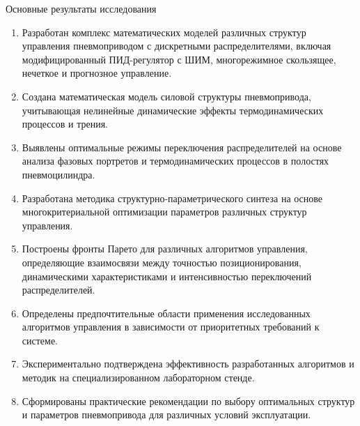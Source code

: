 \begin{frame}{Основные результаты исследования}
	\begin{enumerate}
		\item \scriptsize Разработан комплекс математических моделей различных структур управления пневмоприводом с дискретными распределителями, включая модифицированный
		      ПИД-регулятор с ШИМ, многорежимное скользящее, нечеткое и прогнозное управление.
		\item \scriptsize Создана математическая модель силовой структуры
		      пневмопривода, учитывающая нелинейные динамические эффекты термодинамических процессов и трения.
		\item \scriptsize Выявлены оптимальные режимы переключения распределителей на
		      основе анализа фазовых портретов и термодинамических процессов в полостях пневмоцилиндра.
		\item \scriptsize Разработана методика структурно-параметрического синтеза
		      на основе многокритериальной оптимизации параметров различных структур управления.
		\item \scriptsize Построены фронты Парето для различных алгоритмов управления, определяющие
		      взаимосвязи между точностью позиционирования, динамическими характеристиками и интенсивностью переключений распределителей.
		\item \scriptsize Определены предпочтительные области применения исследованных
		      алгоритмов управления в зависимости от приоритетных требований к системе.
		\item \scriptsize Экспериментально подтверждена эффективность разработанных алгоритмов и
		      методик на специализированном лабораторном стенде.
		\item \scriptsize Сформированы практические рекомендации по выбору оптимальных структур и
		      параметров пневмопривода для различных условий эксплуатации.

	\end{enumerate}


\end{frame}

